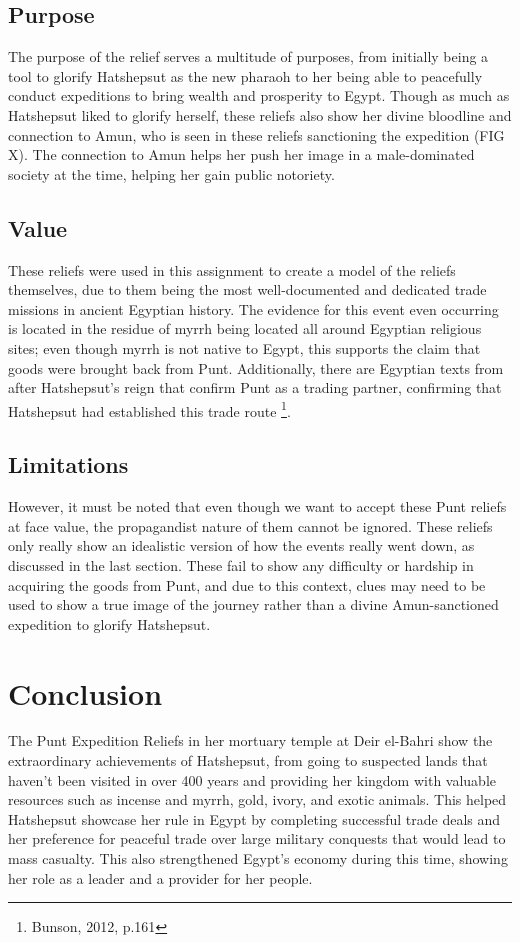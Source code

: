 \documentclass[12pt, letterpaper]{article}
\begin{document}
\subsection*{Purpose}
The purpose of the relief serves a multitude of purposes, from initially being a tool to glorify Hatshepsut as the new pharaoh to her being able to peacefully conduct expeditions to bring wealth and prosperity to Egypt. Though as much as Hatshepsut liked to glorify herself, these reliefs also show her divine bloodline and connection to Amun, who is seen in these reliefs sanctioning the expedition (FIG X). The connection to Amun helps her push her image in a male-dominated society at the time, helping her gain public notoriety.

\subsection*{Value}
These reliefs were used in this assignment to create a model of the reliefs themselves, due to them being the most well-documented and dedicated trade missions in ancient Egyptian history. The evidence for this event even occurring is located in the residue of myrrh being located all around Egyptian religious sites; even though myrrh is not native to Egypt, this supports the claim that goods were brought back from Punt. Additionally, there are Egyptian texts from after Hatshepsut's reign that confirm Punt as a trading partner, confirming that Hatshepsut had established this trade route \footnote{Bunson, 2012, p.161}.

\subsection*{Limitations}
However, it must be noted that even though we want to accept these Punt reliefs at face value, the propagandist nature of them cannot be ignored. These reliefs only really show an idealistic version of how the events really went down, as discussed in the last section. These fail to show any difficulty or hardship in acquiring the goods from Punt, and due to this context, clues may need to be used to show a true image of the journey rather than a divine Amun-sanctioned expedition to glorify Hatshepsut.


\section*{Conclusion}
The Punt Expedition Reliefs in her mortuary temple at Deir el-Bahri show the extraordinary achievements of Hatshepsut, from going to suspected lands that haven’t been visited in over 400 years and providing her kingdom with valuable resources such as incense and myrrh, gold, ivory, and exotic animals. This helped Hatshepsut showcase her rule in Egypt by completing successful trade deals and her preference for peaceful trade over large military conquests that would lead to mass casualty. This also strengthened Egypt’s economy during this time, showing her role as a leader and a provider for her people.
\end{document}
